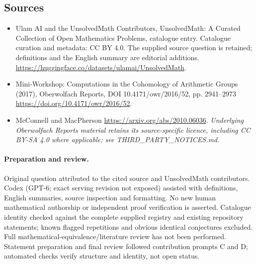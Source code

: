 \documentclass[11pt]{article}
\begin{document}
\subsection{Sources}
\begin{itemize}
\item[\hypertarget{source:statement:1}{S1}] Ulam AI and the UnsolvedMath Contributors, UnsolvedMath: A Curated Collection of Open Mathematics Problems, catalogue entry. Catalogue curation and metadata: CC BY 4.0. The supplied source question is retained; definitions and the English summary are editorial additions.
\url{https://huggingface.co/datasets/ulamai/UnsolvedMath}.
\item[\hypertarget{source:statement:2}{S2}] Mini-Workshop: Computations in the Cohomology of Arithmetic Groups (2017), Oberwolfach Reports, DOI 10.4171/owr/2016/52, pp. 2941--2973
\url{https://doi.org/10.4171/owr/2016/52}.
\item[\hypertarget{source:statement:3}{S3}] McConnell and MacPherson
\url{https://arxiv.org/abs/2010.06036}.
\textit{Underlying Oberwolfach Reports material retains its source-specific licence, including CC BY-SA 4.0 where applicable; see THIRD\_PARTY\_NOTICES.md.}
\end{itemize}
\paragraph{Preparation and review.}
Original question attributed to the cited source and UnsolvedMath contributors. Codex (GPT-6; exact serving revision not exposed) assisted with definitions, English summaries, source inspection and formatting. No new human mathematical authorship or independent proof verification is asserted. Catalogue identity checked against the complete supplied registry and existing repository statements; known flagged repetitions and obvious identical conjectures excluded. Full mathematical-equivalence/literature review has not been performed. Statement preparation and final review followed contribution prompts C and D; automated checks verify structure and identity, not open status.
\label{end:statement}
\end{document}
